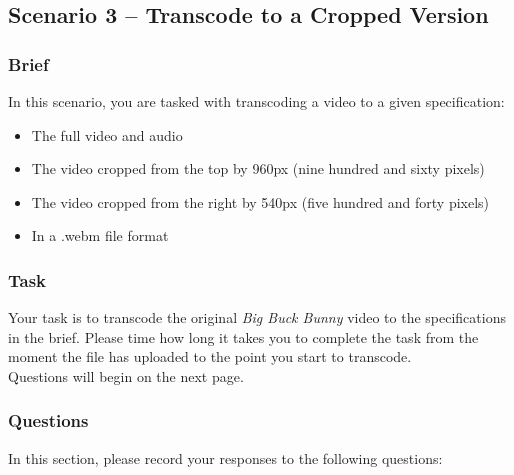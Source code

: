 \subsection{Scenario 3 – Transcode to a Cropped Version}
\subsubsection{Brief}
In this scenario, you are tasked with transcoding a video to a given specification:
\begin{itemize}
    \item The full video and audio
    \item The video cropped from the top by 960px (nine hundred and sixty pixels)
    \item The video cropped from the right by 540px (five hundred and forty pixels)
    \item In a .webm file format
\end{itemize}

\subsubsection{Task}
Your task is to transcode the original \emph{Big Buck Bunny} video to the specifications in the brief.
Please time how long it takes you to complete the task from the moment the file has uploaded to the point you start to transcode. \\
Questions will begin on the next page.

\clearpage

\subsubsection{Questions}

In this section, please record your responses to the following questions:
